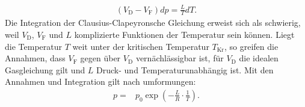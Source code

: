 \begin{align}
(V_\mathrm{D}-V_\mathrm{F})dp=\frac{L}{T}dT\label{eqn:clausius}.
\end{align}
Die Integration der Clausius-Clapeyronsche Gleichung erweist sich als schwierig, weil $V_\mathrm{D}$, $V_\mathrm{F}$ und $L$
komplizierte Funktionen der Temperatur sein können.
Liegt die Temperatur $T$ weit unter der kritischen Temperatur $T_\mathrm{Kr}$, so greifen die Annahmen, dass
$V_\mathrm{F}$ gegen über
$V_\mathrm{D}$ vernächlässigbar ist, für $V_\mathrm{D}$
die idealen Gasgleichung gilt und $L$ Druck- und
Temperaturunabhängig ist.
Mit den Annahmen und Integration gilt nach umformungen:
\begin{align}
  p=&p_\mathrm{0}\exp\left(-\frac{L}{R}\cdot\frac{1}{T}\right)\label{eqn:cceinfach}.
\end{align}
